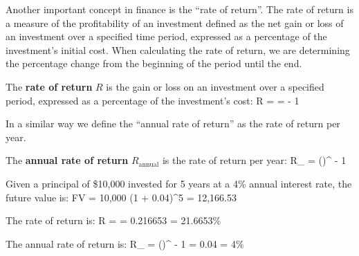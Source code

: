 Another important concept in finance is the ``rate of return''. The rate of return is a measure of the profitability
of an investment defined as the net gain or loss of an investment over a specified time period, expressed as a
percentage of the investment's initial cost. When calculating the rate of return, we are determining the percentage
change from the beginning of the period until the end.

The \textbf{rate of return} $R$ is the gain or loss on an investment over a specified period, expressed as a percentage
of the investment's cost:
\bse
R =  =  - 1
\ese
\ed

In a similar way we define the ``annual rate of return'' as the rate of return per year.

 \label{def:annual_rate_of_return}
The \textbf{annual rate of return} $R_{\text{annual}}$ is the rate of return per year:
\bse
R_{} = \Big(\Big)^{} - 1
\ese
\ed

\be
Given a principal of \$10,000 invested for 5 years at a 4\% annual interest rate, the future value is:
\bse
FV = 10,000 \cdot \left(1 + 0.04\right)^5 = 12,166.53
\ese

The rate of return is:
\bse
R =  = 0.216653 = 21.6653\%
\ese

The annual rate of return is:
\bse
R_{} = \Big(\Big)^{} - 1 = 0.04 = 4\%
\ese
\ee